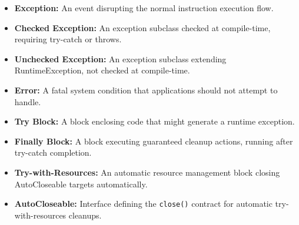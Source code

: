 \documentclass[12pt,a4paper]{article}
\begin{document}
\begin{tcolorbox}[defbox, title={\textbf{One-Line Definitions}}]
\begin{itemize}[leftmargin=*, itemsep=2pt]
  \item \textbf{Exception:} An event disrupting the normal instruction execution flow.
  \item \textbf{Checked Exception:} An exception subclass checked at compile-time, requiring try-catch or throws.
  \item \textbf{Unchecked Exception:} An exception subclass extending RuntimeException, not checked at compile-time.
  \item \textbf{Error:} A fatal system condition that applications should not attempt to handle.
  \item \textbf{Try Block:} A block enclosing code that might generate a runtime exception.
  \item \textbf{Finally Block:} A block executing guaranteed cleanup actions, running after try-catch completion.
  \item \textbf{Try-with-Resources:} An automatic resource management block closing AutoCloseable targets automatically.
  \item \textbf{AutoCloseable:} Interface defining the \texttt{close()} contract for automatic try-with-resources cleanups.
\end{itemize}
\end{tcolorbox}
\end{document}
